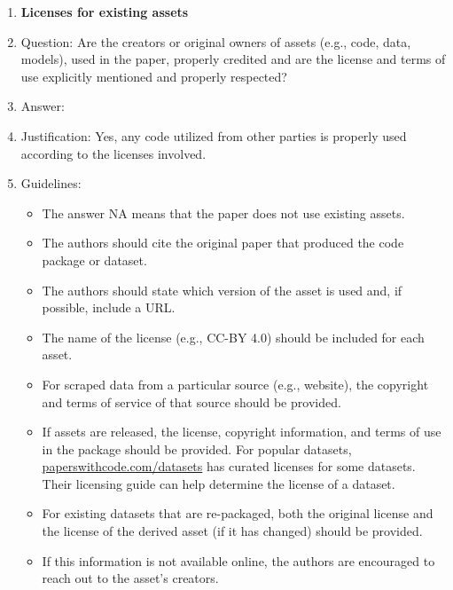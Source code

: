 \documentclass{article}
\begin{document}
\begin{enumerate}
\item {\bf Licenses for existing assets}
    \item[] Question: Are the creators or original owners of assets (e.g., code, data, models), used in the paper, properly credited and are the license and terms of use explicitly mentioned and properly respected?
    \item[] Answer: \answerYes{} %
    \item[] Justification: Yes, any code utilized from other parties is properly used according to the licenses involved.
    \item[] Guidelines:
    \begin{itemize}
        \item The answer NA means that the paper does not use existing assets.
        \item The authors should cite the original paper that produced the code package or dataset.
        \item The authors should state which version of the asset is used and, if possible, include a URL.
        \item The name of the license (e.g., CC-BY 4.0) should be included for each asset.
        \item For scraped data from a particular source (e.g., website), the copyright and terms of service of that source should be provided.
        \item If assets are released, the license, copyright information, and terms of use in the package should be provided. For popular datasets, \url{paperswithcode.com/datasets} has curated licenses for some datasets. Their licensing guide can help determine the license of a dataset.
        \item For existing datasets that are re-packaged, both the original license and the license of the derived asset (if it has changed) should be provided.
        \item If this information is not available online, the authors are encouraged to reach out to the asset's creators.
    \end{itemize}


\end{enumerate}
\end{document}
